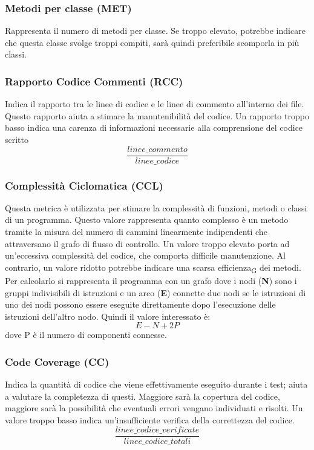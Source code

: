 \subsubsection{Metodi per classe (MET)}
Rappresenta il numero di metodi per classe. Se troppo elevato, potrebbe indicare che questa classe svolge troppi compiti, sarà quindi preferibile scomporla in più classi.

\subsubsection{Rapporto Codice Commenti (RCC)}
Indica il rapporto tra le linee di codice e le linee di commento all'interno dei file. Questo rapporto aiuta a stimare la manutenibilità del codice. Un rapporto troppo basso indica una carenza di informazioni necessarie alla comprensione del codice scritto
\[\frac{linee\_commento}{linee\_codice}\]

\subsubsection{Complessità Ciclomatica (CCL)}
Questa metrica è utilizzata per stimare la complessità di funzioni, metodi o classi di un programma. Questo valore rappresenta quanto complesso è un metodo tramite la misura del numero di cammini linearmente indipendenti che attraversano il grafo di flusso di controllo. Un valore troppo elevato porta ad un'eccessiva complessità del codice, che comporta difficile manutenzione. Al contrario, un valore ridotto potrebbe indicare una scarsa efficienza\textsubscript{G} dei metodi. Per calcolarlo si rappresenta il programma con un grafo dove i  nodi (\textbf{N}) sono i gruppi indivisibili di istruzioni e un arco (\textbf{E}) connette due nodi se le istruzioni di uno dei nodi possono essere eseguite direttamente dopo l'esecuzione delle istruzioni dell'altro nodo. Quindi il valore interessato è:
\[E-N+2P\]
dove P è il numero di componenti connesse.
\subsubsection{Code Coverage (CC)}
Indica la quantità di codice che viene effettivamente eseguito durante i test; aiuta a valutare la completezza di questi. Maggiore sarà la copertura del codice, maggiore sarà la possibilità che eventuali errori vengano individuati e risolti. Un valore troppo basso indica un'insufficiente verifica della correttezza del codice.
\[\frac{linee\_codice\_verificate}{linee\_codice\_totali}\]

